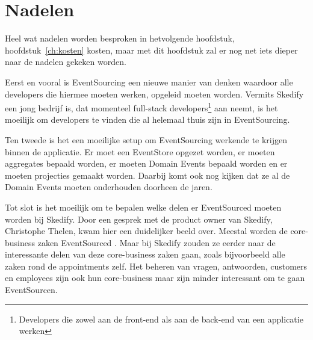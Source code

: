 
\chapter{Nadelen}
\label{ch:nadelen}

Heel wat nadelen worden besproken in hetvolgende hoofdstuk, hoofdstuk~\ref{ch:kosten} kosten, maar met dit hoofdstuk zal er nog net iets dieper naar de nadelen gekeken worden.

Eerst en vooral is EventSourcing een nieuwe manier van denken waardoor alle developers die hiermee moeten werken, opgeleid moeten worden. Vermits Skedify een jong bedrijf is, dat momenteel full-stack developers\footnote{Developers die zowel aan de front-end als aan de back-end van een applicatie werken} aan neemt, is het moeilijk om developers te vinden die al helemaal thuis zijn in EventSourcing.

Ten tweede is het een moeilijke setup om EventSourcing werkende te krijgen binnen de applicatie. Er moet een EventStore opgezet worden, er moeten aggregates bepaald worden, er moeten Domain Events bepaald worden en er moeten projecties gemaakt worden. Daarbij komt ook nog kijken dat ze al de Domain Events moeten onderhouden doorheen de jaren.

Tot slot is het moeilijk om te bepalen welke delen er EventSourced moeten worden bij Skedify. Door een gesprek met de product owner van Skedify, Christophe Thelen, kwam hier een duidelijker beeld over. Meestal worden de core-business zaken EventSourced \autocite{Young2010WhyEventSourcing}. Maar bij Skedify zouden ze eerder naar de interessante delen van deze core-business zaken gaan, zoals bijvoorbeeld alle zaken rond de appointments zelf. Het beheren van vragen, antwoorden, customers en employees zijn ook hun core-business maar zijn minder interessant om te gaan EventSourcen.